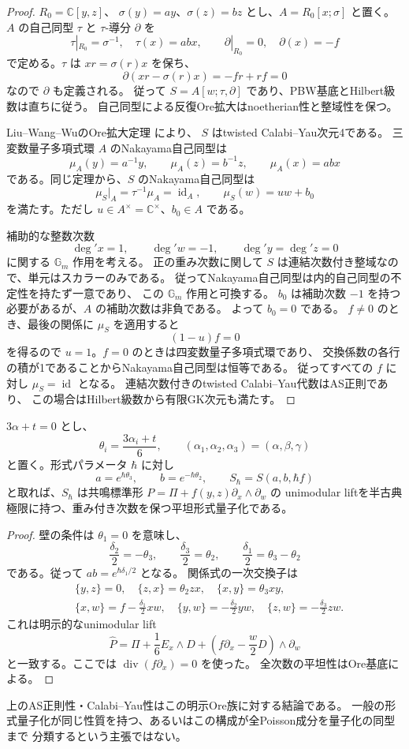 \begin{proof}
$R_0=\mathbb C[y,z]$、
$\sigma(y)=ay$、$\sigma(z)=bz$ とし、$A=R_0[x;\sigma]$ と置く。
$A$ の自己同型 $\tau$ と $\tau$-導分 $\partial$ を
\[
 \tau|_{R_0}=\sigma^{-1},\quad \tau(x)=abx,
 \qquad \partial|_{R_0}=0,\quad \partial(x)=-f
\]
で定める。$\tau$ は $xr=\sigma(r)x$ を保ち、
\[
 \partial(xr-\sigma(r)x)=-fr+rf=0
\]
なので $\partial$ も定義される。
従って $S=A[w;\tau,\partial]$ であり、PBW基底とHilbert級数は直ちに従う。
自己同型による反復Ore拡大はnoetherian性と整域性を保つ。

Liu--Wang--WuのOre拡大定理\cite[Theorem 3.3]{LWW} により、
$S$ はtwisted Calabi--Yau次元4である。
三変数量子多項式環 $A$ のNakayama自己同型は
\[
 \mu_A(y)=a^{-1}y,\qquad \mu_A(z)=b^{-1}z,
 \qquad \mu_A(x)=abx
\]
である。同じ定理から、$S$ のNakayama自己同型は
\[
 \mu_S|_A=\tau^{-1}\mu_A=\operatorname{id}_A,
 \qquad \mu_S(w)=u w+b_0
\]
を満たす。ただし $u\in A^\times=\mathbb C^\times$、$b_0\in A$ である。

補助的な整数次数
\[
 \deg' x=1,\qquad\deg' w=-1,\qquad\deg' y=\deg' z=0
\]
に関する $\mathbb G_m$ 作用を考える。
正の重み次数に関して $S$ は連結次数付き整域なので、単元はスカラーのみである。
従ってNakayama自己同型は内的自己同型の不定性を持たず一意であり、
この $\mathbb G_m$ 作用と可換する。
$b_0$ は補助次数 $-1$ を持つ必要があるが、$A$ の補助次数は非負である。
よって $b_0=0$ である。
$f\neq0$ のとき、最後の関係に $\mu_S$ を適用すると
\[
 (1-u)f=0
\]
を得るので $u=1$。$f=0$ のときは四変数量子多項式環であり、
交換係数の各行の積が1であることからNakayama自己同型は恒等である。
従ってすべての $f$ に対し $\mu_S=\operatorname{id}$ となる。
連結次数付きのtwisted Calabi--Yau代数はAS正則であり、
この場合はHilbert級数から有限GK次元も満たす。
\end{proof}

\begin{corollary}[共鳴成分の半古典極限]
\label{cor:resonance-quantization-v32}
$3\alpha+t=0$ とし、
\[
 \theta_i=\frac{3\alpha_i+t}{6},\qquad
 (\alpha_1,\alpha_2,\alpha_3)=(\alpha,\beta,\gamma)
\]
と置く。形式パラメータ $\hbar$ に対し
\[
 a=e^{\hbar\theta_3},\qquad b=e^{-\hbar\theta_2},\qquad
 S_\hbar=S(a,b,\hbar f)
\]
と取れば、$S_\hbar$ は共鳴標準形
$P=\Pi+f(y,z)\partial_x\wedge\partial_w$ の
unimodular liftを半古典極限に持つ、重み付き次数を保つ平坦形式量子化である。
\end{corollary}

\begin{proof}
壁の条件は $\theta_1=0$ を意味し、
\[
 \frac{\delta_2}{2}=-\theta_3,\qquad
 \frac{\delta_3}{2}=\theta_2,\qquad
 \frac{\delta_1}{2}=\theta_3-\theta_2
\]
である。従って $ab=e^{\hbar\delta_1/2}$ となる。
関係式の一次交換子は
\begin{align*}
 &\{y,z\}=0,\quad\{z,x\}=\theta_2zx,
       \quad\{x,y\}=\theta_3xy,\\
 &\{x,w\}=f-\frac{\delta_1}{2}xw,
 \quad\{y,w\}=-\frac{\delta_2}{2}yw,
 \quad\{z,w\}=-\frac{\delta_3}{2}zw.
\end{align*}
これは明示的なunimodular lift
\[
 \widehat P=\Pi+\frac16E_x\wedge D+
       \left(f\partial_x-\frac w2D\right)\wedge\partial_w
\]
と一致する。ここでは $\operatorname{div}(f\partial_x)=0$ を使った。
全次数の平坦性はOre基底による。
\end{proof}

上のAS正則性・Calabi--Yau性はこの明示Ore族に対する結論である。
一般の形式量子化が同じ性質を持つ、あるいはこの構成が全Poisson成分を量子化の同型まで
分類するという主張ではない。
